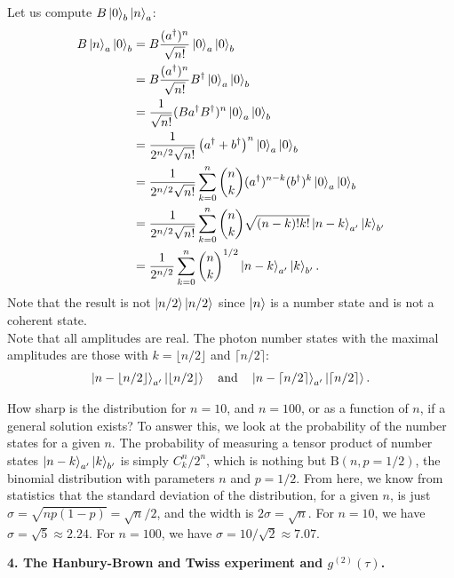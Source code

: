 \documentclass{article}
\theoremstyle{definition}
\newcommand{\f}[2]{\frac{#1}{#2}}
\newcommand{\lp}{\left(}
\newcommand{\rp}{\right)}
\begin{document}
\begin{enumerate}[label=\alph*)]
Let us compute $B\ket{0}_b\ket{n}_a$:
\begin{align*}
B\ket{n}_a \ket{0}_b 
&= B \f{(a^\dagger)^n}{\sqrt{n!}} \ket{0}_{a}\ket{0}_{b} \\
&= B \f{(a^\dagger)^n}{\sqrt{n!}} B^\dagger \ket{0}_{a}\ket{0}_{b} \\
&= \f{1}{\sqrt{n!}} (B a^\dagger B^\dagger)^n \ket{0}_a \ket{0}_b \\
&= \f{1}{2^{n/2} \sqrt{n!} } \lp a^\dagger + b^\dagger \rp^n \ket{0}_a \ket{0}_b \\
&= \f{1}{2^{n/2} \sqrt{n!}} \sum_{k=0}^n  {n\choose{k }} (a^\dagger)^{n-k} (b^\dagger)^{k} \ket{0}_a \ket{0}_b \\
&= \f{1}{2^{n/2} \sqrt{n!}} \sum_{k=0}^n {n\choose{k }}  \sqrt{(n-k)! k! }  \ket{n-k}_{a'} \ket{k}_{b'} \\
&= \f{1}{2^{n/2}} \sum_{k=0}^n  {n \choose{k}}^{1/2} \ket{n-k}_{a'} \ket{k}_{b'}.
\end{align*}
Note that the result is not $\ket{n/2}\ket{n/2}$ since $\ket{n}$ is a number state and is not a coherent state. \\

Note that all amplitudes are real. The photon number states with the maximal amplitudes are those with $k = \lfloor{n/2} \rfloor$ and $\lceil{n/2} \rceil$: 
\begin{align*}
\ket{n - \lfloor{n/2}\rfloor}_{a'} \ket{\lfloor{n/2}\rfloor } 
\quad \text{and} \quad 
\ket{n - \lceil{n/2}\rceil}_{a'} \ket{\lceil{n/2}\rceil }.
\end{align*}

How sharp is the distribution for $n = 10$, and $n = 100$, or as a function of $n$, if a general solution exists? To answer this, we look at the probability of the number states for a given $n$. The probability of measuring a tensor product of number states $\ket{n-k}_{a'}\ket{k}_{b'}$ is simply $C^{n}_k/2^{n}$, which is nothing but $\text{B}(n,p=1/2)$, the binomial distribution with parameters $n$ and $p=1/2$. From here, we know from statistics that the standard deviation of the distribution, for a given $n$, is just $\sigma = \sqrt{np(1-p)} = \sqrt{n}/2$, and the width is $2\sigma = \sqrt{n}$.  For $n=10$, we have $\sigma = \sqrt{5} \approx 2.24$. For $n=100$, we have $\sigma = 10/\sqrt{2} \approx 7.07$. 

\end{enumerate}


\noindent \textbf{4. The Hanbury-Brown and Twiss experiment and $g^{(2)}(\tau)$.} \\
\end{document}
